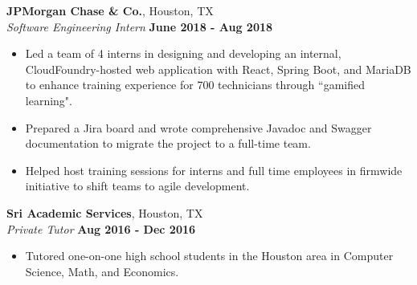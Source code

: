 \documentclass[margin,line]{resume}
\begin{document}
\begin{resume}
\begin{itemize}
\end{itemize}

\textbf{JPMorgan Chase \& Co.}, Houston, TX \vspace{2mm}\\\vspace{1mm}%
\textsl{Software Engineering Intern} \hfill \textbf{June 2018 - Aug 2018}
\begin{itemize}
    \item Led a team of 4 interns in designing and developing an internal, CloudFoundry-hosted web application with React, Spring Boot, and MariaDB to enhance training experience for 700 technicians through ``gamified learning".
    \item Prepared a Jira board and wrote comprehensive Javadoc and Swagger documentation to migrate the project to a full-time team.
    \item Helped host training sessions for interns and full time employees in firmwide initiative to shift teams to agile development.
\end{itemize}

\textbf{Sri Academic Services}, Houston, TX \vspace{2mm}\\\vspace{1mm}%
\textsl{Private Tutor} \hfill \textbf{Aug 2016 - Dec 2016}
\begin{itemize}
    \item Tutored one-on-one high school students in the Houston area in Computer Science, Math, and Economics.
\end{itemize}

\begin{comment}
\textbf{Fishburn Violin Shop}, Tomball, TX \vspace{2mm}\\\vspace{1mm}%
\textsl{Sales Associate} \hfill \textbf{Aug 2015 -
Aug 2016}
\begin{itemize}
    \item Worked in a sales team of five at a local violin shop servicing six school districts in the northwest Houston area.
    \item Helped maintain rental logs for over 2,000 contracted customers, organized deliveries of rental instruments to public schools, assisted customers with instrument maintenance and repair.
\end{itemize}
\end{comment}
\vspace{1mm}%


\end{resume}
\end{document}
